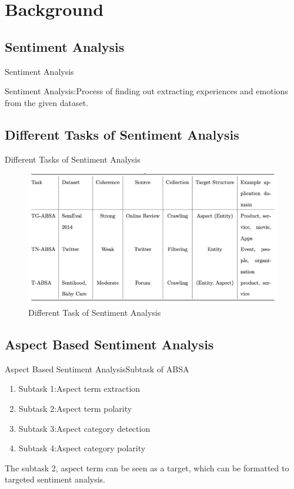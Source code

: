 \documentclass[xcolor=dvipsnames]{beamer}
\begin{document}

\section{Background}
\subsection{Sentiment Analysis}
\begin{frame}{Sentiment Analysis}

  Sentiment Analysis:Process of finding out extracting experiences and emotions from the given dataset.

\end{frame}

\subsection{Different Tasks of Sentiment Analysis}
\begin{frame}{Different Tasks of Sentiment Analysis}

  \begin{figure}[]
    \includegraphics[width=0.7\linewidth]{./image/task.png}
    \caption{Different Task of Sentiment Analysis}
  \label{example}
\end{figure}

\end{frame}

\subsection{Aspect Based Sentiment Analysis}
\begin{frame}{Aspect Based Sentiment Analysis}{Subtask of ABSA}
  \begin{enumerate}
    \item Subtask 1:Aspect term extraction
    \item Subtask 2:Aspect term polarity
    \item Subtask 3:Aspect category detection
    \item Subtask 4:Aspect category polarity
  \end{enumerate}

  The subtask 2, aspect term can be seen as a target, which can be formatted to targeted sentiment analysis.\cite{pontiki-etal-2014-semeval}
\end{frame}
\end{document}
